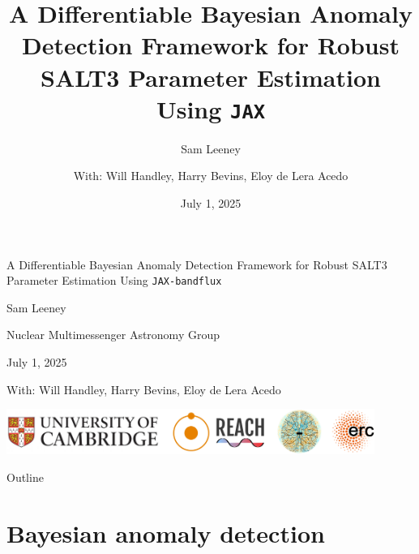 \documentclass[aspectratio=169]{beamer}
\title{A Differentiable Bayesian Anomaly Detection Framework for Robust SALT3 Parameter Estimation Using \texttt{JAX}}
\subtitle{Sam Leeney}
\date{July 1, 2025}
\author{With: Will Handley, Harry Bevins, Eloy de Lera Acedo}
\institute{Nuclear Multimessenger Astronomy Group, Rotterdam}
\begin{document}
\begin{frame}
  \begin{center}
    {\Large A Differentiable Bayesian Anomaly Detection Framework for Robust SALT3 Parameter Estimation Using \texttt{JAX-bandflux}\par}
    \vspace{0.3cm}

    {\normalsize Sam Leeney\par}
    \vspace{0.3cm}

    {\small Nuclear Multimessenger Astronomy Group\par}
    {\small July 1, 2025\par}
    \vspace{0.5cm}

    {\scriptsize With: Will Handley, Harry Bevins, Eloy de Lera Acedo\par}
    \vfill

    \includegraphics[width=0.9\textwidth]{images/affiliations.png}
  \end{center}
\end{frame}

\begin{frame}{Outline}
  \tableofcontents[hideallsubsections]
\end{frame}


\section{Bayesian anomaly detection}
\end{document}
